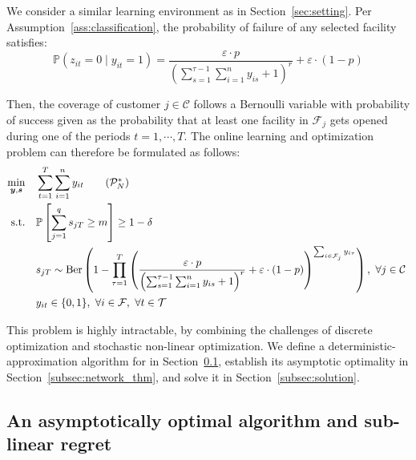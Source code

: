 \documentclass[nonblindrev]{informs3noheader}
\DeclareMathOperator\Ber{Ber}
\def\P{\mathbb{P}}
\def\calC{\mathcal{C}}
\def\calF{\mathcal{F}}
\def\calP{\mathcal{P}}
\def\calT{\mathcal{T}}
\def\bs{\boldsymbol{s}}
\def\by{\boldsymbol{y}}
\def\st{\text{s.t.}}
\begin{document}
We consider a similar learning environment as in Section~\ref{sec:setting}. Per Assumption~\ref{ass:classification}, the probability of failure of any selected facility satisfies:
\begin{equation}\label{eq:Bernoulli}
\P(z_{it}=0 \mid y_{it}=1)=\frac{\varepsilon\cdot p}{\left(\sum_{s=1}^{\tau-1} \sum_{i=1}^n y_{is} + 1\right)^r}+\varepsilon\cdot(1-p)
\end{equation}

Then, the coverage of customer $j\in\calC$ follows a Bernoulli variable with probability of success given as the probability that at least one facility in $\calF_j$ gets opened during one of the periods $t=1,\cdots,T$. The online learning and optimization problem can therefore be formulated as follows:
\begin{align}
    \min_{\by,\bs} \quad & \sum_{t=1}^T \sum_{i=1}^n y_{it} \label{prob:network}\tag{$\calP_N^*$}\\
    \st\quad&\P\left[\sum_{j=1}^q s_{jT} \geq m\right] \geq 1-\delta \nonumber\\
    \quad& s_{jT}\sim \Ber\left(1-\prod_{\tau=1}^T \left(\frac{\varepsilon\cdot p}{\left(\sum_{s=1}^{\tau-1} \sum_{i=1}^n y_{is} + 1\right)^r}+\varepsilon\cdot(1-p)\right)^{\sum_{i \in \calF_j} y_{i\tau}}\right),\ \forall j\in\calC\ \nonumber\\
    \quad& y_{it}\in\{0,1\},\ \forall i\in \calF, \ \forall t\in\calT\nonumber
\end{align}

This problem is highly intractable, by combining the challenges of discrete optimization and stochastic non-linear optimization. We define a deterministic-approximation algorithm for in Section~\ref{subsec:network_ALG}, establish its asymptotic optimality in Section~\ref{subsec:network_thm}, and solve it in Section~\ref{subsec:solution}.

\subsection{An asymptotically optimal algorithm and sub-linear regret}
\label{subsec:network_ALG}
\end{document}
